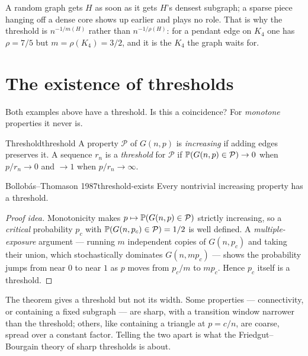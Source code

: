 \begin{insight}
A random graph gets $H$ as soon as it gets $H$'s densest subgraph; a sparse
piece hanging off a dense core shows up earlier and plays no role. That is why
the threshold is $n^{-1/m(H)}$ rather than $n^{-1/\rho(H)}$: for a pendant edge
on $K_4$ one has $\rho=7/5$ but $m=\rho(K_4)=3/2$, and it is the $K_4$ the graph
waits for.
\end{insight}

\section{The existence of thresholds}

Both examples above have a threshold. Is this a coincidence? For \emph{monotone}
properties it never is.

\begin{definition}{Threshold}{threshold}
A property $\mathcal P$ of $G(n,p)$ is \emph{increasing} if adding edges preserves
it. A sequence $r_n$ is a \emph{threshold} for $\mathcal P$ if $\mathbb{P}(G(n,p)\in
\mathcal P)\to0$ when $p/r_n\to0$ and $\to1$ when $p/r_n\to\infty$.
\end{definition}

\begin{theorem}{Bollob\'as--Thomason 1987}{threshold-exists}
Every nontrivial increasing property has a threshold.
\end{theorem}

\begin{proof}[Proof idea]
Monotonicity makes $p\mapsto\mathbb{P}(G(n,p)\in\mathcal P)$ strictly increasing, so a
\emph{critical} probability $p_c$ with $\mathbb{P}(G(n,p_c)\in\mathcal P)=1/2$ is
well defined. A \emph{multiple-exposure} argument --- running $m$ independent
copies of $G(n,p_c)$ and taking their union, which stochastically dominates
$G(n,mp_c)$ --- shows the probability jumps from near $0$ to near $1$ as $p$ moves
from $p_c/m$ to $mp_c$. Hence $p_c$ itself is a threshold.
\end{proof}

\begin{insight}
The theorem gives a threshold but not its width. Some properties ---
connectivity, or containing a fixed subgraph --- are sharp, with a transition
window narrower than the threshold; others, like containing a triangle at
$p=c/n$, are coarse, spread over a constant factor. Telling the two apart is
what the Friedgut--Bourgain theory of sharp thresholds is about.
\end{insight}

